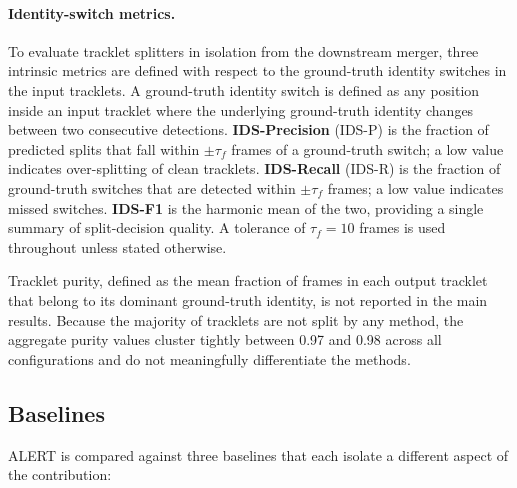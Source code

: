 \paragraph{Identity-switch metrics.}
To evaluate tracklet splitters in isolation from the downstream merger, three intrinsic metrics are defined with respect to the ground-truth identity switches in the input tracklets. A ground-truth identity switch is defined as any position inside an input tracklet where the underlying ground-truth identity changes between two consecutive detections. \textbf{IDS-Precision} (IDS-P) is the fraction of predicted splits that fall within $\pm\tau_f$ frames of a ground-truth switch; a low value indicates over-splitting of clean tracklets. \textbf{IDS-Recall} (IDS-R) is the fraction of ground-truth switches that are detected within $\pm\tau_f$ frames; a low value indicates missed switches. \textbf{IDS-F1} is the harmonic mean of the two, providing a single summary of split-decision quality. A tolerance of $\tau_f = 10$ frames is used throughout unless stated otherwise.

Tracklet purity, defined as the mean fraction of frames in each output tracklet that belong to its dominant ground-truth identity, is not reported in the main results. Because the majority of tracklets are not split by any method, the aggregate purity values cluster tightly between 0.97 and 0.98 across all configurations and do not meaningfully differentiate the methods.

\subsection{Baselines}\label{subsec:baselines}

ALERT is compared against three baselines that each isolate a different aspect of the contribution:

